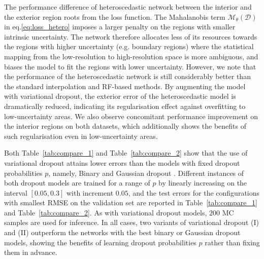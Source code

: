 The performance difference of heteroscedastic network between the interior and the exterior region roots from the loss function. The Mahalanobis term $\mathcal{M}_{\theta}(\mathcal{D})$ in eq.\eqref{eq:loss_hetero} imposes a larger penalty on the regions with smaller intrinsic uncertainty. The network therefore allocates less of its resources towards the regions with higher uncertainty (e.g. boundary regions) where the statistical mapping from the low-resolution to high-resolution space is more ambiguous, and biases the model to fit the regions with lower uncertainty. However, we note that the performance of the heteroscedastic network is still considerably better than the standard interpolation and RF-based methods. By augmenting the model with variational dropout, the exterior error of the heteroscedastic model is dramatically reduced, indicating its regularisation effect against overfitting to low-uncertainty areas. We also observe concomitant performance improvement on the interior regions on both datasets, which additionally shows the benefits of such regularisation even in low-uncertainty areas. 

Both Table~\ref{tab:compare_1} and Table~\ref{tab:compare_2} show that the use of variational dropout attains lower errors than the models with fixed dropout probabilities $p$, namely, Binary and Gaussian dropout \cite{srivastava2014dropout}. Different instances of both dropout models are trained for a range of $p$ by linearly increasing on the interval $[0.05,0.3]$ with increment $0.05$, and the test errors for the configurations with smallest RMSE on the validation set are reported in Table~\ref{tab:compare_1} and Table~\ref{tab:compare_2}. As with variational dropout models, $200$ MC samples are used for inference. In all cases, two variants of variational dropout (I) and (II) outperform the networks with the best binary or Gaussian dropout models, showing the benefits of learning dropout probabilities $p$ rather than fixing them in advance. 

